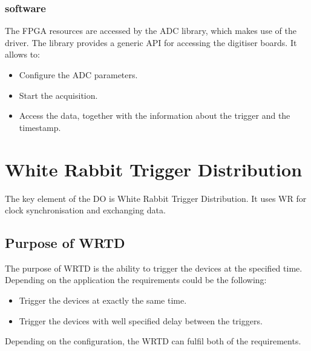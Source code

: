         \subsubsection{software}
            The FPGA resources are accessed by the ADC library, which makes use of the driver. The library provides a generic API for accessing the digitiser boards. It allows to:
            \begin{itemize}
                \item Configure the ADC parameters.
                \item Start the acquisition.
                \item Access the data, together with the information about the trigger and the timestamp.
            \end{itemize}

        
\section{White Rabbit Trigger Distribution} \label{section:WRTD}
    The key element of the DO is White Rabbit Trigger Distribution. It uses WR for clock synchronisation and exchanging data.
    \subsection{Purpose of WRTD} \label{subsec:purpose_of_wrtd}
        The purpose of WRTD is the ability to trigger the devices at the specified time. Depending on the application the requirements could be the following:
        \begin{itemize}
            \item Trigger the devices at exactly the same time.
            \item Trigger the devices with well specified delay between the triggers. 
        \end{itemize}
        Depending on the configuration, the WRTD can fulfil both of the requirements. 
    
